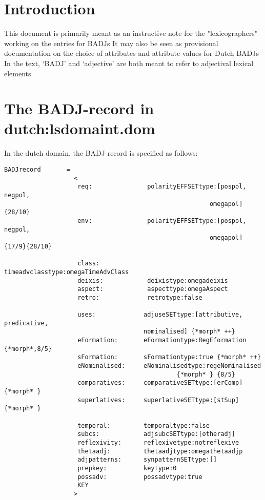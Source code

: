 

   \RosDate{\today}
   \RosSupersedes{-}
   \MakeRosTitle
%
%
\section{Introduction}

This document is primarily meant as an instructive note for the
"lexicographers" working on the entries for BADJs
It may also be seen as provisional 
documentation on the choice of attributes and attribute
values for Dutch BADJs
In the text, `BADJ' and `adjective' are both meant to refer to adjectival
lexical elements.

\section{The BADJ-record in dutch:lsdomaint.dom}
In the dutch domain, the BADJ record is specified as follows:
\begin{verbatim}
BADJrecord       =
                   <
                    req:               polarityEFFSETtype:[pospol, negpol, 
                                                        omegapol]      {28/10}
                    env:               polarityEFFSETtype:[pospol, negpol,
                                                        omegapol]{17/9}{28/10}  

                    class:             timeadvclasstype:omegaTimeAdvClass
                    deixis:            deixistype:omegadeixis
                    aspect:            aspecttype:omegaAspect
                    retro:             retrotype:false

                    uses:             adjuseSETtype:[attributive, predicative,
                                      nominalised] {*morph* ++} 
                    eFormation:       eFormationtype:RegEformation {*morph*,8/5}
                    sFormation:       sFormationtype:true {*morph* ++}
                    eNominalised:     eNominalisedtype:regeNominalised
                                               {*morph* } {8/5}
                    comparatives:     comparativeSETtype:[erComp]  {*morph* } 
                    superlatives:     superlativeSETtype:[stSup]  {*morph* } 

                    temporal:         temporaltype:false
                    subcs:            adjsubcSETtype:[otheradj]
                    reflexivity:      reflexivetype:notreflexive
                    thetaadj:         thetaadjtype:omegathetaadjp
                    adjpatterns:      synpatternSETtype:[]
                    prepkey:          keytype:0
                    possadv:          possadvtype:true
                    KEY
                   >
\end{verbatim}

